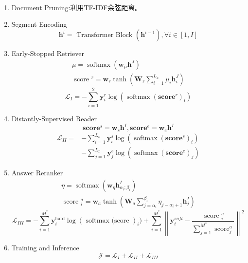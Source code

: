 \documentclass[a4paper,UTF8]{article}
\numberwithin{equation}{section}
\begin{document}
\begin{enumerate}
	\item Document Pruning:利用TF-IDF余弦距离。
	\item Segment Encoding\begin{equation}
		\mathbf{h}^{i}=\text { Transformer Block }\left(\mathbf{h}^{i-1}\right), \forall i \in[1, I]
		\end{equation}
	\item Early-Stopped Retriever
	\begin{equation}
	\begin{array}{c}{\mu=\operatorname{softmax}\left(\mathbf{w}_{\mu} \mathbf{h}^{J}\right)} \\ {\text { score }^{r}=\mathbf{w}_{r} \tanh \left(\mathbf{W}_{r} \sum_{i=1}^{L_{x}} \mu_{i} \mathbf{h}_{i}^{J}\right)}\end{array}
	\end{equation}
	\begin{equation}
		\mathcal{L}_{I}=-\sum_{i=1}^{2} \mathbf{y}_{i}^{r} \log \left(\operatorname{softmax}\left(\mathbf{s c o r e}^{r}\right)_{i}\right)
		\end{equation}
	\item Distantly-Supervised Reader
	\begin{equation}
		\mathbf{s c o r e}^{s}=\mathbf{w}_{s} \mathbf{h}^{I}, \mathbf{s c o r e}^{e}=\mathbf{w}_{e} \mathbf{h}^{I}
		\end{equation}
		\begin{equation}
		\begin{aligned} \mathcal{L}_{I I}=&-\sum_{i=1}^{L_{x}} \mathbf{y}_{i}^{s} \log \left(\operatorname{softmax}\left(\mathbf{score}^{s}\right)_{i}\right) \\ &-\sum_{j=1}^{L_{x}} \mathbf{y}_{j}^{e} \log \left(\operatorname{softmax}\left(\mathbf{s c o r e}^{e}\right)_{j}\right) \end{aligned}
		\end{equation}
	\item Answer Reranker
	\begin{equation}
	\begin{array}{c}{\eta=\operatorname{softmax}\left(\mathbf{w}_{\eta} \mathbf{h}_{\alpha_{i} ; \beta_{i}}^{I}\right)} \\ {\text { score }_{i}^{a}=\mathbf{w}_{a} \tanh \left(\mathbf{W}_{a} \sum_{j=\alpha_{i}}^{\beta_{i}} \eta_{j-\alpha_{i}+1} \mathbf{h}_{j}^{I}\right)}\end{array}
	\end{equation}
	\begin{equation}
		\mathcal{L}_{I I I}=-\sum_{i=1}^{M^{*}} \mathbf{y}_{i}^{\text {hard}} \log (\text { softmax (score })_{i} )+\sum_{i=1}^{M^{*}}\left\|\mathbf{y}_{i}^{s o f t}-\frac{\text { score }_{i}^{a}}{\sum_{j=1}^{M^{*}} \operatorname{score}_{j}^{a}}\right\|^{2}
		\end{equation}
	\item Training and Inference
	\begin{equation}
		\mathcal{J}=\mathcal{L}_{I}+\mathcal{L}_{I I}+\mathcal{L}_{I I I}
		\end{equation}
\end{enumerate}
\end{document}
